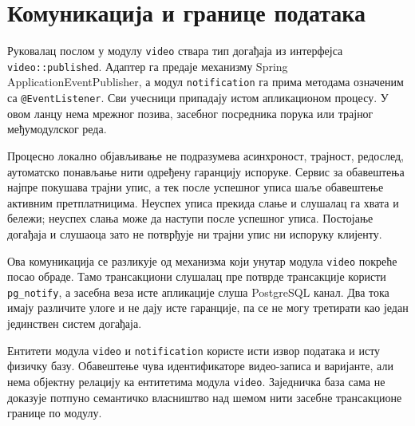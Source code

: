 \documentclass[12pt,oneside]{memoir}
\begin{document}
\section{Комуникација и границе података}

Руковалац послом у модулу \texttt{video} ствара тип догађаја из интерфејса
\texttt{video::published}. Адаптер га предаје механизму
{\lat Spring \mbox{ApplicationEvent}\allowbreak\mbox{Publisher}}, а модул
\texttt{notifi\allowbreak cation} га прима методама означеним са
\mbox{\texttt{@EventListener}}. Сви учесници припадају
истом апликационом процесу. У овом ланцу нема мрежног позива, засебног
посредника порука или трајног међумодулског реда.


Процесно локално објављивање не подразумева асинхроност, трајност, редослед,
аутоматско понављање нити одређену гаранцију испоруке. Сервис за обавештења
најпре покушава трајни упис, а тек после успешног уписа шаље обавештење
активним претплатницима. Неуспех уписа прекида слање и слушалац га хвата и
бележи; неуспех слања може да наступи после успешног уписа. Постојање догађаја
и слушаоца зато не потврђује ни трајни упис ни испоруку клијенту.


Ова комуникација се разликује од механизма који унутар модула \texttt{video}
покреће посао обраде. Тамо трансакциони слушалац пре потврде трансакције
користи \texttt{pg\_notify}, а засебна веза исте апликације слуша
{\lat PostgreSQL}
канал. Два тока имају различите улоге и не дају исте гаранције, па се не могу
третирати као један јединствен систем догађаја.


Ентитети модула \texttt{video} и \texttt{notifi\allowbreak cation} користе исти извор
података и исту физичку базу. Обавештење чува идентификаторе видео-записа и
варијанте, али нема објектну релацију ка ентитетима модула \texttt{video}.
Заједничка база сама не доказује потпуно семантичко власништво над шемом нити
засебне трансакционе границе по модулу.
\end{document}
